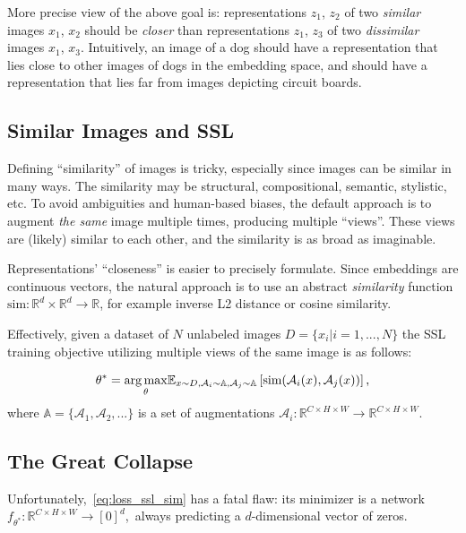 More precise view of the above goal is: representations $z_1$, $z_2$ of two \textit{similar} images $x_1$, $x_2$ should be \textit{closer} than representations $z_1$, $z_3$ of two \textit{dissimilar} images $x_1$, $x_3$. Intuitively, an image of a dog should have a representation that lies close to other images of dogs in the embedding space, and should have a representation that lies far from images depicting circuit boards. 

\subsection{Similar Images and SSL}\label{sec:similar_imgs_ssl}

Defining ``similarity'' of images is tricky, especially since images can be similar in many ways. The similarity may be structural, compositional, semantic, stylistic, etc. To avoid ambiguities and human-based biases, the default approach is to augment \textit{the same} image multiple times, producing multiple ``views''. These views are (likely) similar to each other, and the similarity is as broad as imaginable. 

Representations' ``closeness'' is easier to precisely formulate. Since embeddings are continuous vectors, the natural approach is to use an abstract \textit{similarity} function $\text{sim}: \mathbb{R}^d\times\mathbb{R}^d\rightarrow\mathbb{R}$, for example inverse L2 distance or cosine similarity. 

Effectively, given a dataset of $N$ unlabeled images $D=\{x_i|i=1,...,N\}$ the SSL training objective utilizing multiple views of the same image is as follows:

\begin{equation}
    \theta^*=\underset{\theta}{\operatorname*{arg\,max}}
    \mathbb{E}_{x\sim D,\mathcal{A}_i\sim{\mathbb{A}},\mathcal{A}_j\sim\mathbb{A}}
    \left[
        \text{sim}(\mathcal{A}_i(x),\mathcal{A}_j(x))
        \right]\text{,}
    \label{eq:loss_ssl_sim}
\end{equation}
where $\mathbb{A}=\{\mathcal{A}_1,\mathcal{A}_2,...\}$ is a set of augmentations $\mathcal{A}_i: \mathbb{R}^{C\times H\times W} \rightarrow \mathbb{R}^{C\times H\times W}$.

\subsection{The Great Collapse}\label{sec:ssl_collapse}

Unfortunately,~\cref{eq:loss_ssl_sim} has a fatal flaw: its minimizer is a network $f_{\theta^*}: \mathbb{R}^{C\times H\times W}\rightarrow[0]^d$,~\ie always predicting a $d$-dimensional vector of zeros. 

